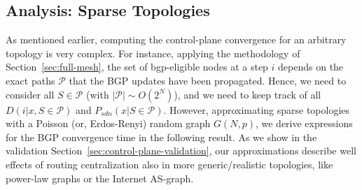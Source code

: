 \subsection{Analysis: Sparse Topologies}\label{sec:poisson}


As mentioned earlier, computing the control-plane convergence for an arbitrary topology is very complex. For instance, applying the methodology of Section~\ref{sec:full-mesh}, the set of bgp-eligible nodes at a step $i$ depends on the exact paths $\mathcal{P}$ that the BGP updates have been propagated. Hence, we need to consider all $S\in\mathcal{P}$ (with $|\mathcal{P}|\sim O\left(2^{N}\right)$), and we need to keep track of all $D(i|x,S\in\mathcal{P})$ and $P_{sdn}(x|S\in\mathcal{P})$. However, approximating sparse topologies with a Poisson (or, Erdos-Renyi) random graph $G(N,p)$, we derive expressions for the BGP convergence time in the following result. As we show in the validation Section~\ref{sec:control-plane-validation}, our approximations describe well effects of routing centralization also in more generic/realistic topologies, like power-law graphs or the Internet AS-graph.






%

